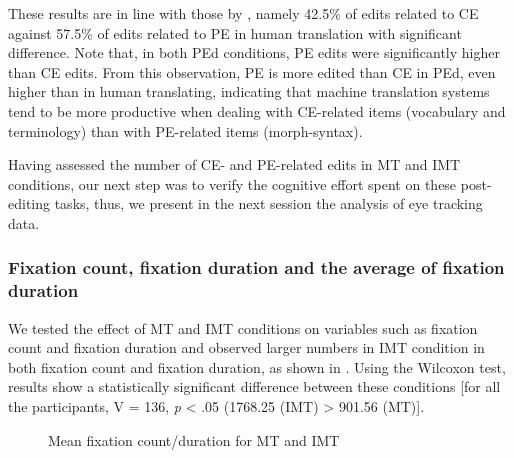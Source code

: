 \documentclass[output=paper]{langsci/langscibook}
\begin{document}
These results are in line with those by \citet{alves2013}, namely 42.5\% of edits related to CE against 57.5\% of edits related to PE in human translation with significant difference. Note that, in both PEd conditions, PE edits were significantly higher than CE edits. From this observation, PE is more edited than CE in PEd, even higher than in human translating, indicating that machine translation systems tend to be more productive when dealing with CE-related items (vocabulary and terminology) than with PE-related items (morph-syntax).  


\largerpage
Having assessed the number of CE- and PE-related edits in MT and IMT conditions, our next step was to verify the cognitive effort spent on these post-editing tasks, thus, we present in the next session the analysis of eye tracking data.


\subsubsection{Fixation count, fixation duration and the average of fixation duration\label{alves:sec:FixationCount}}

\largerpage[2]
We tested the effect of MT and IMT conditions on variables such as fixation count and fixation duration and observed larger numbers in IMT condition in both fixation count and fixation duration, as shown in . Using the Wilcoxon test, results show a statistically significant difference between these conditions [for all the participants, V = 136, \textit{p} {\textless} .05 (1768.25 (IMT) {\textgreater} 901.56 (MT)].


\begin{figure}
 \caption{Mean fixation count/duration for MT and IMT%
}
 \label{sarto:fig:6}
\end{figure} 
\end{document}
